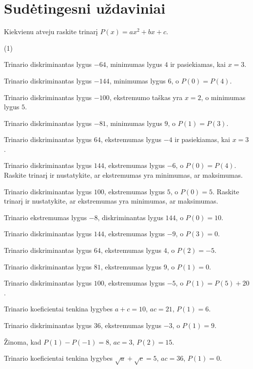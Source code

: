 \documentclass[11pt,a4paper]{scrartcl}
\makeatletter
\numberwithin{exercise}{section}
\renewenvironment{exercise}{\@thm{\th@definition}{exercise}{}}{\@endtheorem}
\makeatother
\begin{document}
\section{Sudėtingesni uždaviniai}

\begin{exercise} Kiekvienu atveju raskite trinarį $P(x) = ax ^{2} +bx+c$.

\begin{tasks}[label=(\arabic*),label-width=1.8em,label-offset=0.1em,item-indent=2em](1)

\task Trinario diskriminantas lygus $-64$, minimumas lygus $4$ ir pasiekiamas, kai $x=3$.

\task Trinario diskriminantas lygus $-144$, minimumas lygus $6$, o $P(0)=P(4)$.

\task Trinario diskriminantas lygus $-100$, ekstremumo taškas yra $x=2$, o minimumas lygus $5$.

\task Trinario diskriminantas lygus $-81$, minimumas lygus $9$, o $P(1)=P(3)$.

\task Trinario diskriminantas lygus $64$, ekstremumas lygus $-4$ ir pasiekiamas, kai $x=3$.

\task Trinario diskriminantas lygus $144$, ekstremumas lygus $-6$, o $P(0)=P(4)$. Raskite trinarį ir nustatykite, ar ekstremumas yra minimumas, ar maksimumas.

\task Trinario diskriminantas lygus $100$, ekstremumas lygus $5$, o $P(0)=5$. Raskite trinarį ir nustatykite, ar ekstremumas yra minimumas, ar maksimumas.

\task Trinario ekstremumas lygus $-8$, diskriminantas lygus $144$, o $P(0)=10$.

\task Trinario diskriminantas lygus $144$, ekstremumas lygus $-9$, o $P(3)=0$.

\task Trinario diskriminantas lygus $64$, ekstremumas lygus $4$, o $P(2)=-5$.

\task Trinario diskriminantas lygus $81$, ekstremumas lygus $9$, o $P(1)=0$.

\task Trinario diskriminantas lygus $100$, ekstremumas lygus $-5$, o $P(1)=P(5)+20$.

\task Trinario koeficientai tenkina lygybes $a+c=10$, $ac=21$, $P(1)=6$.

\task Trinario diskriminantas lygus $36$, ekstremumas lygus $-3$, o $P(1)=9$.

\task Žinoma, kad $P(1)-P(-1)=8$, $ac=3$, $P(2)=15$.

\task Trinario koeficientai tenkina lygybes $\sqrt{a}+\sqrt{c}=5$, $ac=36$, $P(1)=0$.


\end{tasks}
\end{exercise}
\end{document}
